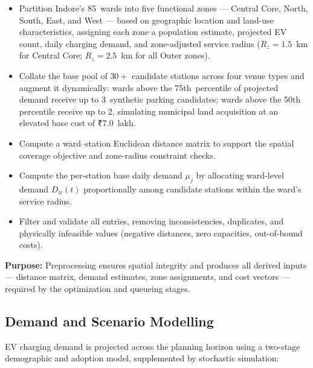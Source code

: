 \begin{itemize}
    \item Partition Indore's 85~wards into five functional zones ---
          Central Core, North, South, East, and West --- based on
          geographic location and land-use characteristics, assigning
          each zone a population estimate, projected EV count, daily
          charging demand, and zone-adjusted service radius
          ($R_z = 1.5$~km for Central Core; $R_z = 2.5$~km for all
          Outer zones).
    \item Collate the base pool of $30+$ candidate stations across
          four venue types and augment it dynamically: wards above
          the 75th~percentile of projected demand receive up to
          3~synthetic parking candidates; wards above the 50th
          percentile receive up to 2, simulating municipal land
          acquisition at an elevated base cost of ₹7.0~lakh.
    \item Compute a ward--station Euclidean distance matrix to
          support the spatial coverage objective and zone-radius
          constraint checks.
    \item Compute the per-station base daily demand $\mu_j$ by
          allocating ward-level demand $D_w(t)$ proportionally among
          candidate stations within the ward's service radius.
    \item Filter and validate all entries, removing inconsistencies,
          duplicates, and physically infeasible values (negative
          distances, zero capacities, out-of-bound costs).
\end{itemize}

\noindent\textbf{Purpose:} Preprocessing ensures spatial integrity and
produces all derived inputs --- distance matrix, demand estimates,
zone assignments, and cost vectors --- required by the optimization
and queueing stages.

\subsection{Demand and Scenario Modelling}
EV charging demand is projected across the planning horizon using a
two-stage demographic and adoption model, supplemented by stochastic
simulation:

